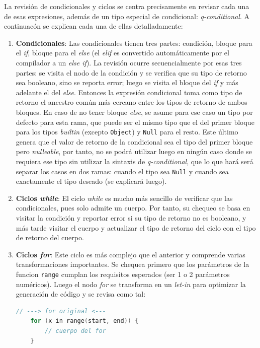 \documentclass{llncs}
\begin{document}
La revisión de condicionales y ciclos se centra precisamente en revisar cada una de esas expresiones, además de un tipo 
especial de condicional: \textit{q-conditional}. A continuacón se explican cada una de ellas detalladamente: 
\begin{enumerate}
    \item \textbf{Condicionales}: Las condicionales tienen tres partes: condición, bloque para el \textit{if}, bloque para el \textit{else} 
    (el \textit{elif} es convertido automáticamente por el compilador a un \textit{else if}). La revisión ocurre secuencialmente por esas tres partes: 
    se visita el nodo de la condición y se verifica que su tipo de retorno sea booleano, sino se reporta error; luego se visita el bloque del \textit{if} 
    y más adelante el del \textit{else}. Entonces la expresión condicional toma como tipo de retorno el ancestro común más cercano entre los tipos de retorno 
    de ambos bloques. En caso de no tener bloque \textit{else}, se asume para ese caso un tipo por defecto para esta rama, que puede ser el mismo tipo que el del 
    primer bloque para los tipos \textit{builtin} (excepto \texttt{Object}) y \texttt{Null} para el resto. Este último genera que el valor de retorno de la condicional 
    sea el tipo del primer bloque pero \textit{nulleable}, por tanto, no se podrá utilizar luego en ningún caso donde se requiera ese tipo sin utilizar la sintaxis de \textit{q-conditional}, 
    que lo que hará será separar los casos en dos ramas: cuando el tipo sea \texttt{Null} y cuando sea exactamente el tipo deseado (se explicará luego).
    \item \textbf{Ciclos \textit{while}}: El ciclo \textit{while} es mucho más sencillo de verificar que las condicionales, pues solo admite un cuerpo. Por tanto, su chequeo se basa en 
    visitar la condición y reportar error si su tipo de retorno no es booleano, y más tarde visitar el cuerpo y actualizar el tipo de retorno del ciclo con el tipo de retorno del cuerpo.
    \item \textbf{Ciclos \textit{for}}: Este ciclo es más complejo que el anterior y comprende varias transformaciones importantes. Se chequea primero que los parámetros de la funcion \texttt{range} 
    cumplan los requisitos esperados (ser 1 o 2 parámetros numéricos). Luego el nodo \textit{for} se transforma en un \textit{let-in} para optimizar la generación de código y se revisa como tal: 
    \begin{lstlisting}[language=C]
    // ---> for original <---
    for (x in range(start, end)) {
        // cuerpo del for
    }


\end{lstlisting}
\end{enumerate}
\end{document}
